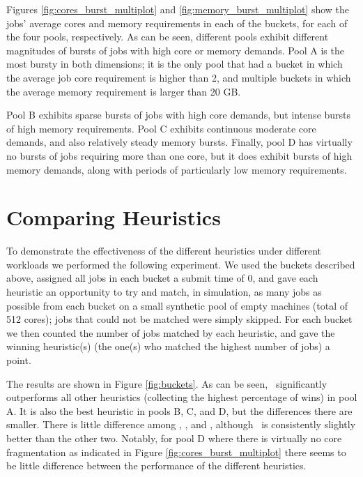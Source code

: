 Figures \ref{fig:cores_burst_multiplot} and
\ref{fig:memory_burst_multiplot} show the jobs' average cores and
memory requirements in each of the buckets, for each of the four pools,
respectively.
As can be seen, different pools exhibit different magnitudes of bursts
of jobs with high core or memory demands.
Pool A is the most bursty in both dimensions; it is the only pool that
had a bucket in which the average job core requirement is higher than
2, and multiple buckets in which the average memory requirement is
larger than 20 GB.

Pool B exhibits sparse bursts of jobs with high core demands, but
intense bursts of high memory requirements.
Pool C exhibits continuous moderate core demands, and also relatively
steady memory bursts.
Finally, pool D has virtually no bursts of jobs requiring more than
one core, but it does exhibit bursts of high memory demands, along
with periods of particularly low memory requirements.


\section{Comparing Heuristics}\label{sec:buckets}

To demonstrate the effectiveness of the different heuristics under different workloads 
we performed the following experiment.
We used the buckets described above, assigned all jobs in each bucket a submit
time of 0, and gave each heuristic an opportunity to try and match, in simulation, 
as many jobs as possible from each bucket on a small synthetic pool of
empty machines (total of 512 cores);
jobs that could not be matched were simply skipped.
For each bucket we then counted the number of jobs matched by each heuristic, 
and gave the winning heuristic(s) (the one(s) who matched the highest
number of jobs) a point.



The results are shown in Figure \ref{fig:buckets}.
As can be seen, \wfc\ significantly outperforms all other heuristics 
(collecting the highest percentage of wins) in pool A. 
It is also the best heuristic in pools B, C, and D, 
but the differences there are smaller.
There is little difference among \bfm, \wfm, and \bfc, although
\wfm\ is consistently slightly better than the other two.
Notably, for pool D where there is virtually no core fragmentation 
as indicated in Figure \ref{fig:cores_burst_multiplot}
there seems to be little difference between the performance of the
different heuristics.


